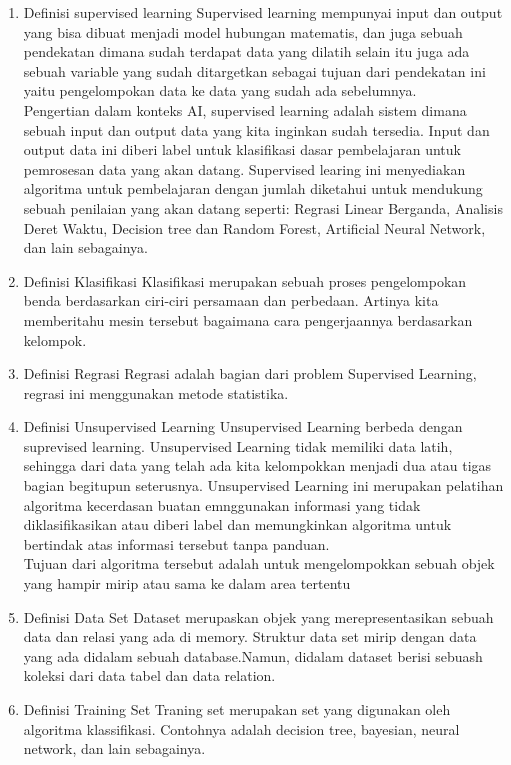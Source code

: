 \begin{enumerate}
\item Definisi supervised learning 
Supervised learning mempunyai input dan output yang bisa dibuat menjadi model hubungan matematis, dan juga sebuah pendekatan dimana sudah terdapat data yang dilatih selain itu juga ada sebuah variable yang sudah ditargetkan sebagai tujuan dari pendekatan ini yaitu pengelompokan data ke data yang sudah ada sebelumnya.\\
Pengertian dalam konteks AI, supervised learning adalah sistem dimana sebuah input dan output data yang kita inginkan sudah tersedia. Input dan output data ini diberi label untuk klasifikasi dasar pembelajaran untuk pemrosesan data yang akan datang. Supervised learing ini menyediakan algoritma untuk pembelajaran dengan jumlah diketahui untuk mendukung sebuah penilaian yang akan datang seperti: Regrasi Linear Berganda, Analisis Deret Waktu, Decision tree dan Random Forest, Artificial Neural Network, dan lain sebagainya.

\item Definisi Klasifikasi
Klasifikasi merupakan sebuah proses pengelompokan benda berdasarkan ciri-ciri persamaan dan perbedaan. Artinya kita memberitahu mesin tersebut bagaimana cara pengerjaannya berdasarkan kelompok.

\item Definisi Regrasi
Regrasi adalah bagian dari problem Supervised Learning, regrasi ini menggunakan metode statistika.

\item Definisi Unsupervised Learning
Unsupervised Learning berbeda dengan suprevised learning. Unsupervised Learning tidak memiliki data latih, sehingga dari data yang telah ada kita kelompokkan menjadi dua atau tigas bagian begitupun seterusnya. Unsupervised Learning ini merupakan pelatihan algoritma kecerdasan buatan emnggunakan informasi yang tidak diklasifikasikan atau diberi label dan memungkinkan algoritma untuk bertindak atas informasi tersebut tanpa panduan. \\
Tujuan dari algoritma tersebut adalah untuk mengelompokkan sebuah objek yang hampir mirip atau sama ke dalam area tertentu

\item Definisi Data Set
Dataset merupaskan objek yang merepresentasikan sebuah data dan relasi yang ada di memory. Struktur data set mirip dengan data yang ada didalam sebuah database.Namun, didalam dataset berisi sebuash koleksi dari data tabel dan data relation.
\item Definisi Training Set
Traning set merupakan set yang digunakan oleh algoritma klassifikasi. Contohnya adalah decision tree, bayesian, neural network, dan lain sebagainya.


\end{enumerate}
